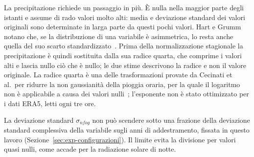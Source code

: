 La precipitazione richiede un passaggio in più. È nulla nella maggior parte degli istanti e assume di rado valori molto alti: media e deviazione standard dei valori originali sono determinate in larga parte da questi pochi valori. Hart e Grumm notano che, se la distribuzione di una variabile è asimmetrica, lo resta anche quella del suo scarto standardizzato~\cite{hart2001anomalies}. Prima della normalizzazione stagionale la precipitazione è quindi sostituita dalla sua radice quarta, che comprime i valori alti e lascia nullo ciò che è nullo; le due stime descrivono la radice e non il valore originale. La radice quarta è una delle trasformazioni provate da Cecinati et al.\ per ridurre la non gaussianità della pioggia oraria, per la quale il logaritmo non è applicabile a causa dei valori nulli~\cite{cecinati2017rainfall}; l'esponente non è stato ottimizzato per i dati ERA5, letti ogni tre ore.

La deviazione standard $\sigma_{nfog}$ non può scendere sotto una frazione della deviazione standard complessiva della variabile sugli anni di addestramento, fissata in questo lavoro (Sezione~\ref{sec:exp-configurazioni}). Il limite evita la divisione per valori quasi nulli, come accade per la radiazione solare di notte.

